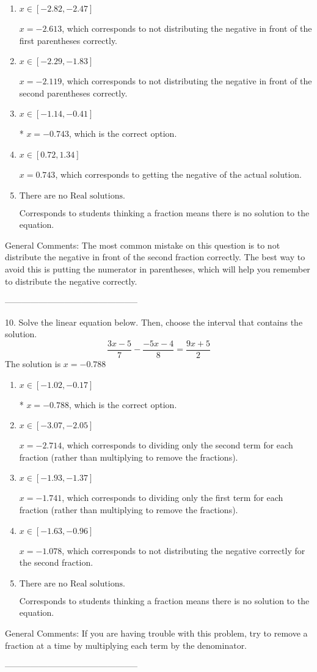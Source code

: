 \documentclass{extbook}[14pt]
\begin{document}
\begin{enumerate}[label=\Alph*.] 
\item $ x \in [-2.82, -2.47] $ 

  $x = -2.613$, which corresponds to not distributing the negative in front of the first parentheses correctly. 
\item $ x \in [-2.29, -1.83] $ 

  $x = -2.119$, which corresponds to not distributing the negative in front of the second parentheses correctly. 
\item $ x \in [-1.14, -0.41] $ 

 * $x = -0.743$, which is the correct option. 
\item $ x \in [0.72, 1.34] $ 

  $x = 0.743$, which corresponds to getting the negative of the actual solution. 
\item $ \text{There are no Real solutions. } $ 

 Corresponds to students thinking a fraction means there is no solution to the equation. 
\end{enumerate} 
 
General Comments: The most common mistake on this question is to not distribute the negative in front of the second fraction correctly. The best way to avoid this is putting the numerator in parentheses, which will help you remember to distribute the negative correctly.

-----------------------------------------------

10. Solve the linear equation below. Then, choose the interval that contains the solution.
\[ \frac{3 x - 5}{7} - \frac{-5 x - 4}{8} = \frac{9 x + 5}{2} \] 
The solution is $ x = -0.788 $ 

\begin{enumerate}[label=\Alph*.] 
\item $ x \in [-1.02, -0.17] $ 

 * $x = -0.788$, which is the correct option. 
\item $ x \in [-3.07, -2.05] $ 

  $x = -2.714$, which corresponds to dividing only the second term for each fraction (rather than multiplying to remove the fractions). 
\item $ x \in [-1.93, -1.37] $ 

  $x = -1.741$, which corresponds to dividing only the first term for each fraction (rather than multiplying to remove the fractions). 
\item $ x \in [-1.63, -0.96] $ 

  $x = -1.078$, which corresponds to not distributing the negative correctly for the second fraction. 
\item $ \text{There are no Real solutions.} $ 

 Corresponds to students thinking a fraction means there is no solution to the equation. 
\end{enumerate} 
 
General Comments: If you are having trouble with this problem, try to remove a fraction at a time by multiplying each term by the denominator.

-----------------------------------------------
\end{document}
